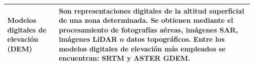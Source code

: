 \begin{table}[H]
\begin{tabularx}{1\textwidth}{p{4.5cm}X}
        \hline
        Modelos digitales de elevación \newline (DEM) & Son representaciones digitales de la altitud superficial de una zona determinada. Se obtienen mediante el procesamiento de fotografías aéreas, imágenes SAR, imágenes LiDAR o datos topográficos. Entre los modelos digitales de elevación más empleados se encuentran: SRTM y ASTER GDEM.        \\
        \hline
    \end{tabularx}
    \begin{minipage}{\textwidth}
        \vspace{10pt}
        \label{tab:TiposImagenesTeledeteccion}
    \end{minipage}
\end{table}